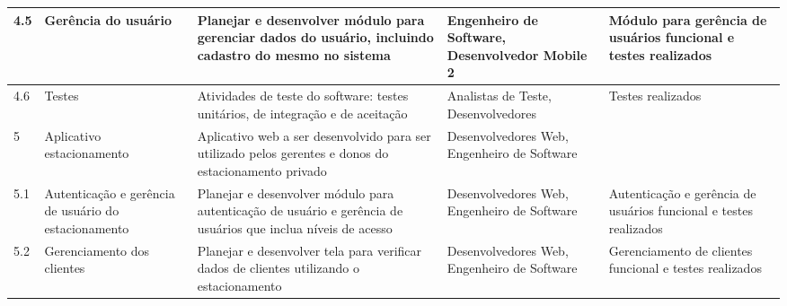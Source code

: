 \begin{landscape}
\begin{longtable}{@{\extracolsep{\fill}}  l  p{}  p{}  p{}  p{}  }
		\midrule
		4.5                    & Gerência do usuário                                    & Planejar e desenvolver módulo para gerenciar dados do usuário, incluindo cadastro do mesmo no sistema                                                                          & Engenheiro de Software, Desenvolvedor Mobile 2                                                   & Módulo para gerência de usuários funcional e testes realizados                                        \\*
		\midrule
		4.6                    & Testes                                                   & Atividades de teste do software: testes unitários, de integração e de aceitação                                                                                                             & Analistas de Teste, Desenvolvedores                                                              & Testes realizados                                                                                        \\*
		\midrule
		5                      & Aplicativo estacionamento                                & Aplicativo web a ser desenvolvido para ser utilizado pelos gerentes e donos do estacionamento privado                                                                            & Desenvolvedores Web, Engenheiro de Software                                                      &                                                                                                          \\*
		\midrule
		5.1                    & Autenticação e gerência de usuário do estacionamento & Planejar e desenvolver módulo para autenticação de usuário e gerência de usuários que inclua níveis de acesso                                                             & Desenvolvedores Web, Engenheiro de Software                                                      & Autenticação e gerência de usuários funcional e testes realizados                                    \\*
		\midrule
		5.2                    & Gerenciamento dos clientes                               & Planejar e desenvolver tela para verificar dados de clientes utilizando o estacionamento                                                                                         & Desenvolvedores Web, Engenheiro de Software                                                      & Gerenciamento de clientes funcional e testes realizados                                                  \\*

\end{longtable}
\end{landscape}
